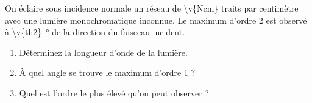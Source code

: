 On éclaire sous incidence normale un réseau de \num{\v{Ncm}} traits par centimètre avec une lumière monochromatique inconnue. Le maximum d'ordre 2 est observé à \qty{\v{th2}}{\degree} de la direction du faisceau incident.

\begin{enumerate}[label=\alph*)]
    \item Déterminez la longueur d'onde de la lumière.
    \item À quel angle se trouve le maximum d'ordre 1 ?
    \item Quel est l'ordre le plus élevé qu'on peut observer ?
\end{enumerate}
